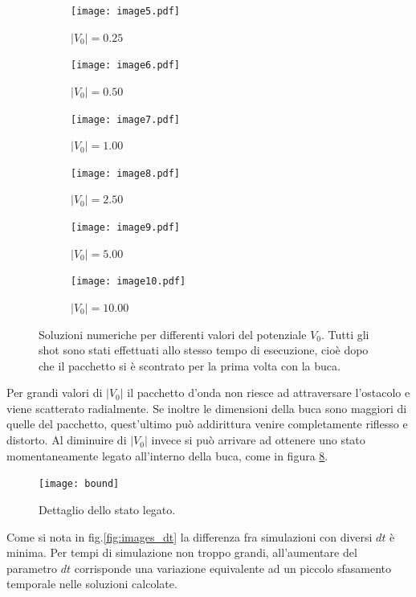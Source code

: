\begin{figure}[H]
 \begin{subfigure}[b]{0.32\textwidth}
  \centering
  \texttt{[image: image5.pdf]}
  \caption{$|V_0|=0.25$}
  \label{fig:image5}
 \end{subfigure}
 \begin{subfigure}[b]{0.32\textwidth}
  \centering
  \texttt{[image: image6.pdf]}
  \caption{$|V_0|=0.50$}
  \label{fig:image6}
 \end{subfigure}
 \begin{subfigure}[b]{0.32\textwidth}
  \centering
  \texttt{[image: image7.pdf]}
  \caption{$|V_0|=1.00$}
  \label{fig:image7}
 \end{subfigure}

 \quad

 \begin{subfigure}[b]{0.32\textwidth}
  \centering
  \texttt{[image: image8.pdf]}
  \caption{$|V_0|=2.50$}
  \label{fig:image8}
 \end{subfigure}
 \begin{subfigure}[b]{0.32\textwidth}
  \centering
  \texttt{[image: image9.pdf]}
  \caption{$|V_0|=5.00$}
  \label{fig:image9}
 \end{subfigure}
 \begin{subfigure}[b]{0.32\textwidth}
  \centering
  \texttt{[image: image10.pdf]}
  \caption{$|V_0|=10.00$}
  \label{fig:image10}
 \end{subfigure}

 \caption{Soluzioni numeriche per differenti valori del potenziale $V_0$. Tutti gli shot sono stati effettuati allo stesso tempo di esecuzione, cioè dopo che il pacchetto si è scontrato per la prima volta con la buca.}\label{fig:images_V0}
\end{figure}

Per grandi valori di $|V_0|$ il pacchetto d'onda non riesce ad attraversare l'ostacolo e viene scatterato radialmente. Se inoltre le dimensioni della buca sono maggiori di quelle del pacchetto, quest'ultimo può addirittura venire completamente riflesso e distorto. Al diminuire di $|V_0|$ invece si può arrivare ad ottenere uno stato momentaneamente legato all'interno della buca, come in figura \ref{fig:bound}.

\begin{figure}[H]
\centering
\texttt{[image: bound]}
\caption{Dettaglio dello stato legato.}
\label{fig:bound}
\end{figure}

Come si nota in fig.\ref{fig:images_dt} la differenza fra simulazioni con diversi $dt$ è minima. Per tempi di simulazione non troppo grandi, all'aumentare del parametro $dt$ corrisponde una variazione equivalente ad un piccolo sfasamento temporale nelle soluzioni calcolate.

